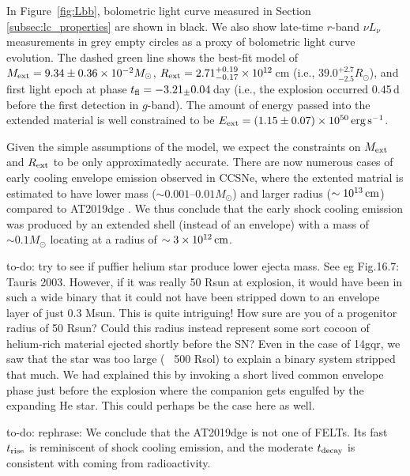 \documentclass[twocolumn]{aastex63}
\newcommand{\todo}[1]{{\color{magenta} to-do: {#1}}}
\begin{document}
\begin{CJK*}{UTF8}{gbsn}
In Figure~\ref{fig:Lbb}, bolometric light curve measured in Section \ref{subsec:lc_properties} are shown 
in black. We also show late-time $r$-band $\nu L_{\nu}$ measurements in grey empty circles as a 
proxy of bolometric light curve evolution. The dashed green line  shows the best-fit model of 
$M_{\rm ext} = 9.34 \pm 0.36 \times 10^{-2} M_\odot$,
 $R_{\rm ext} =2.71_{-0.17}^{+0.19}\times10^{12}$\,cm (i.e., $39.0_{-2.5}^{+2.7} R_\odot$), 
 and first light epoch at phase $t_{\rm fl}= -3.21_\pm 0.04$\,day (i.e., the explosion occurred 0.45\,d 
 before the first detection in $g$-band). The amount of energy passed into the extended material is 
 well constrained to be $E_{\rm ext} = (1.15\pm 0.07) \times 10^{50}\,{\rm erg\, s^{-1}}$.

Given the simple assumptions of the model, we expect the constraints on $M_{\rm ext}$ and $R_{\rm 
ext}$ to be only approximatedly accurate. There are now numerous cases of early cooling envelope 
emission observed in CCSNe, where the extented matrial is estimated to have lower mass ($\sim 
0.001$--$0.01 M_\odot$) and larger radius ($\sim 10^{13}\, {\rm cm}$) compared to AT2019dge 
\citep{Modjaz2019}. We thus conclude that the early shock cooling emission was produced by an 
extended shell (instead of an envelope) with a mass of $\sim 0.1 M_\odot$ locating at a radius of $\sim 
3\times 10^{12}\,{\rm cm}$. 

\todo{try to see if puffier helium star produce lower ejecta mass. See eg Fig.16.7: Tauris 2003.
However, if it was really 50 Rsun at explosion, it would have been in such a wide binary that it could 
not have been 
stripped down to an envelope layer of just 0.3 Msun. This is quite intriguing! How sure are you of a 
progenitor 
radius of 50 Rsun? Could this radius instead represent some sort cocoon of helium-rich material 
ejected shortly 
before the SN? Even in the case of 14gqr, we saw that the star was too large (~ 500 Rsol) to explain a 
binary 
system stripped that much. We had explained this by invoking a short lived common envelope phase 
just before 
the explosion where the companion gets engulfed by the expanding He star. This could perhaps be the 
case here 
as well.}

\todo{rephrase: We conclude that the AT2019dge is not one of FELTs. Its fast $t_{\rm rise}$ is 
reminiscent of shock 
	cooling emission, and the moderate $t_{\rm decay}$ is consistent with coming from radioactivity.}




\end{CJK*}
\end{document}
